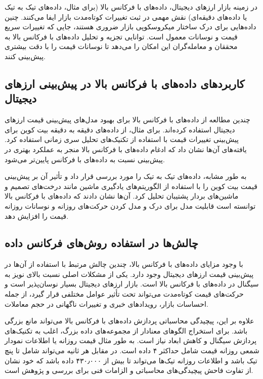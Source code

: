 {در زمینه بازار ارزهای دیجیتال، داده‌های با فرکانس بالا (برای مثال، داده‌های تیک به تیک یا داده‌های دقیقه‌ای) نقش مهمی در ثبت تغییرات کوتاه‌مدت بازار ایفا می‌کنند. چنین داده‌هایی برای درک ساختار میکروسکوپی بازار ضروری هستند، جایی که تغییرات سریع قیمت و نوسانات معمول است. توانایی تجزیه و تحلیل داده‌های با فرکانس بالا به محققان و معامله‌گران این امکان را می‌دهد تا نوسانات قیمت را با دقت بیشتری پیش‌بینی کنند.

\subsection{کاربردهای داده‌های با فرکانس بالا در پیش‌بینی ارزهای دیجیتال}
چندین مطالعه از داده‌های با فرکانس بالا برای بهبود مدل‌های پیش‌بینی قیمت ارزهای دیجیتال استفاده کرده‌اند. برای مثال، \cite{author1} از داده‌های دقیقه به دقیقه بیت کوین برای پیش‌بینی تغییرات قیمت با استفاده از تکنیک‌های تحلیل سری زمانی استفاده کرد. یافته‌های آن‌ها نشان داد که ادغام داده‌های با فرکانس بالا منجر به عملکرد بهتری در پیش‌بینی نسبت به داده‌های با فرکانس پایین‌تر می‌شود.

به طور مشابه، \cite{author2} داده‌های تیک به تیک را مورد بررسی قرار داد و تأثیر آن بر پیش‌بینی قیمت بیت کوین را با استفاده از الگوریتم‌های یادگیری ماشین مانند درخت‌های تصمیم و ماشین‌های بردار پشتیبان تحلیل کرد. آن‌ها نشان دادند که داده‌های با فرکانس بالا توانسته است قابلیت مدل برای درک و مدل کردن حرکت‌های روزانه و نوسانات روزانه قیمت را افزایش دهد.

\subsection{چالش‌ها در استفاده روش‌های فرکانس داده}
با وجود مزایای داده‌های با فرکانس بالا، چندین چالش مرتبط با استفاده از آن‌ها در پیش‌بینی قیمت ارزهای دیجیتال وجود دارد. یکی از مشکلات اصلی نسبت بالای نویز به سیگنال در داده‌های با فرکانس بالا است. بازار ارزهای دیجیتال بسیار نوسان‌پذیر است و حرکت‌های قیمت کوتاه‌مدت می‌تواند تحت تأثیر عوامل مختلفی قرار گیرد، از جمله احساسات بازار، رویدادهای خبری و تغییرات ناگهانی در حجم معاملات.

علاوه بر این، پیچیدگی محاسباتی پردازش داده‌های با فرکانس بالا می‌تواند مانع بزرگی باشد. برای استخراج الگوهای معنادار از مجموعه‌های داده بزرگ، اغلب به تکنیک‌های پردازش سیگنال و کاهش ابعاد نیاز است. به طور مثال قیمت روزانه یا اطلاعات نمودار شمعی روزانه قیمت شامل حداکثر ۴ داده است. در مقابل هر ثانیه می‌تواند شامل تا پنچ تیک باشد و اطلاعات روزانه تیک‌ها می‌تواند تا بیش از ۴۳۰٫۰۰۰ داده باشد که خود نشان از تفاوت فاحش پیچیدگی‌های محاسباتی و الزامات فنی برای بررسی و پژوهش است.

}
